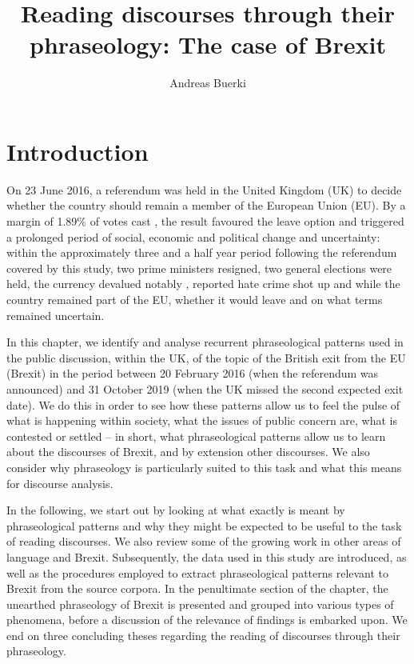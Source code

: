 \documentclass[output=paper]{langscibook}
\author{Andreas Buerki\affiliation{Cardiff University}\orcid{}}
\title[Reading discourses through their phraseology]{Reading discourses through their phraseology: The case of Brexit}
\begin{document}
\maketitle 

\section{Introduction}

On 23 June 2016, a referendum was held in the United Kingdom (UK) to decide whether the country should remain a member of the European Union (EU). By a margin of 1.89\% of votes cast \parencite{ElectoralCommission2019}, the result favoured the leave option and triggered a prolonged period of social, economic and political change and uncertainty: within the approximately three and a half year period following the referendum covered by this study, two prime ministers resigned, two general elections were held, the currency devalued notably \citep{fullfact.org2019a}, reported hate crime shot up \citep{fullfact.org2019b} and while the country remained part of the EU, whether it would leave and on what terms remained uncertain.

In this chapter, we identify and analyse recurrent phraseological patterns used in the public discussion, within the UK, of the topic of the British exit from the EU (Brexit) in the period between 20 February 2016 (when the referendum was announced) and 31 October 2019 (when the UK missed the second expected exit date). We do this in order to see how these patterns allow us to feel the pulse of what is happening within society, what the issues of public concern are, what is contested or settled -- in short, what phraseological patterns allow us to learn about the discourses of Brexit, and by extension other discourses. We also consider why phraseology is particularly suited to this task and what this means for discourse analysis.

In the following, we start out by looking at what exactly is meant by phraseological patterns and why they might be expected to be useful to the task of reading discourses. We also review some of the growing work in other areas of language and Brexit. Subsequently, the data used in this study are introduced, as well as the procedures employed to extract phraseological patterns relevant to Brexit from the source corpora. In the penultimate section of the chapter, the unearthed phraseology of Brexit is presented and grouped into various types of phenomena, before a discussion of the relevance of findings is embarked upon. We end on three concluding theses regarding the reading of discourses through their phraseology.
\end{document}
